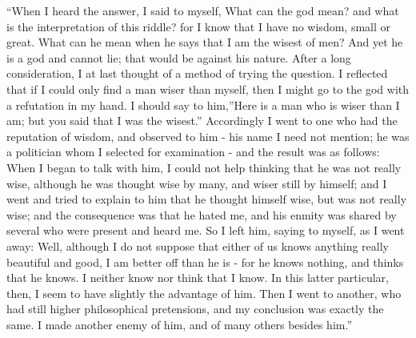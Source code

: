 \documentclass[
]{book}
\begin{document}
``When I heard the answer, I said to myself, What can the god mean? and what is the interpretation of this riddle? for I know that I have no wisdom, small or great. What can he mean when he says that I am the wisest of men? And yet he is a god and cannot lie; that would be against his nature. After a long consideration, I at last thought of a method of trying the question. I reflected that if I could only find a man wiser than myself, then I might go to the god with a refutation in my hand. I should say to him,''Here is a man who is wiser than I am; but you said that I was the wisest.'' Accordingly I went to one who had the reputation of wisdom, and observed to him - his name I need not mention; he was a politician whom I selected for examination - and the result was as follows: When I began to talk with him, I could not help thinking that he was not really wise, although he was thought wise by many, and wiser still by himself; and I went and tried to explain to him that he thought himself wise, but was not really wise; and the consequence was that he hated me, and his enmity was shared by several who were present and heard me. So I left him, saying to myself, as I went away: Well, although I do not suppose that either of us knows anything really beautiful and good, I am better off than he is - for he knows nothing, and thinks that he knows. I neither know nor think that I know. In this latter particular, then, I seem to have slightly the advantage of him. Then I went to another, who had still higher philosophical pretensions, and my conclusion was exactly the same. I made another enemy of him, and of many others besides him.''
\end{document}
